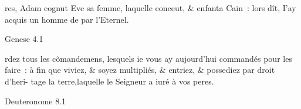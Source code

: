 \documentclass[paper=a6,pagesize=pdftex]{scrbook}
\newcommand{\bibleref}[1]{\begin{flushright}\tiny{#1}\end{flushright}}
\begin{document}
\parbox{6cm}{
res, Adam cognut Eve sa fem\-me, laquelle conceut, \& enfan\-ta
 Cain~: lors dît, I'ay acquis un homme de par l'Eternel.
 \bibleref{Genese 4.1}

\vfill

rdez tous les c\~omandemens, \linebreak
 lesquels ie vous ay aujourd'hui \linebreak
 commandés pour les faire~: à  \linebreak
 fin que viviez, \& soyez multipliés, \& \linebreak
 entriez, \& possediez par droit d'heri- \linebreak
 tage la terre,laquelle le Seigneur a iuré \linebreak à vos peres.
 \bibleref{Deuteronome 8.1}
}
\end{document}
